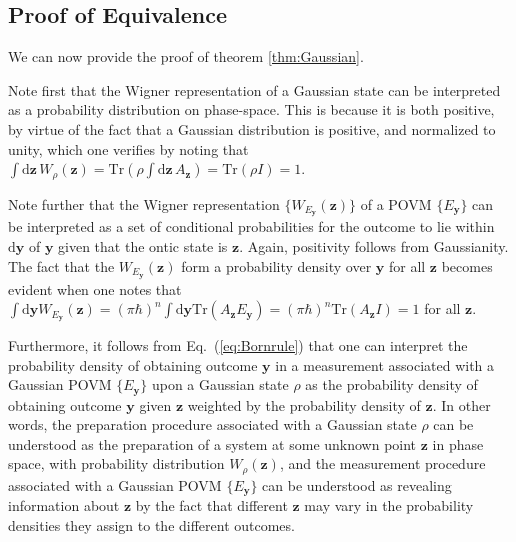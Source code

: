 \documentclass[pra,superscriptaddress,nofootinbib,12pt]{revtex4-2}
\begin{document}
\subsection{Proof of Equivalence}
\label{sec:proofmain}

We can now provide the proof of theorem \ref{thm:Gaussian}.

Note first that the Wigner representation of a Gaussian state
can be interpreted as a probability distribution on phase-space.
This is because it is both positive, by virtue of the fact that a
Gaussian distribution is positive, and normalized to unity, which
one verifies by noting that $\int \mathrm{d}\mathbf{z}\, W_{\rho}(\mathbf{z})=\mathrm{Tr}(\rho\int
\mathrm{d}\mathbf{z}\,A_{\mathbf{z}})=\mathrm{Tr}(\rho I)=1$.

Note further that the Wigner representation $\{W_{E_{\mathbf{y}}}(\mathbf{z})\}$ of a POVM $\{E_{\mathbf{y}}\}$ can be interpreted
as a set of conditional probabilities for the outcome to lie within $\textrm{d}\mathbf{y}$ of ${\mathbf{y}}$ given that the ontic state is $\mathbf{z}$.  Again, positivity follows from Gaussianity. The fact that the $W_{E_{\mathbf{y}}}(\mathbf{z})$ form a probability density over $\mathbf{y}$ for all $\mathbf{z}$ becomes evident when one notes that $\int \textrm{d}\mathbf{y} W_{E_{\mathbf{y}}}(\mathbf{z})=(\pi \hbar)^n\int \textrm{d}\mathbf{y} \mathrm{Tr}(A_{\mathbf{z}}E_{\mathbf{y}})= (\pi \hbar)^n\mathrm{Tr}(A_{\mathbf{z}}I)=1$ for all $\mathbf{z}.$

Furthermore, it follows from Eq.~(\ref{eq:Bornrule}) that one can interpret the probability density of obtaining outcome $\mathbf{y}$ in a measurement associated with a Gaussian POVM $\{E_{\mathbf{y}} \}$ upon a Gaussian state $\rho$ as the probability density of obtaining outcome $\mathbf{y}$ given $\mathbf{z}$ weighted by the probability density of $\mathbf{z}$.  In other words, the preparation procedure associated with a Gaussian state $\rho$ can be understood as the preparation of a system at some unknown point $\mathbf{z}$ in phase space, with probability distribution $W_{\rho}(\mathbf{z})$, and the measurement procedure associated with a Gaussian POVM $\{E_{\mathbf{y}}\}$ can be understood as revealing information about $\mathbf{z}$ by the fact that different $\mathbf{z}$ may vary in the probability densities they assign to the different outcomes.
\end{document}
